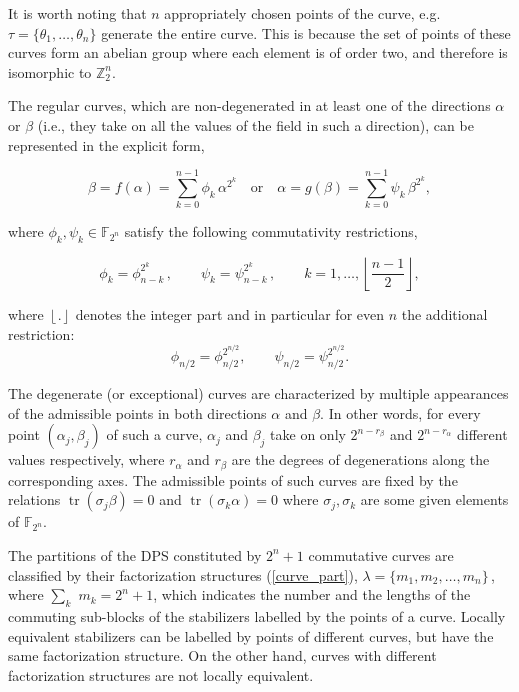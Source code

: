 \documentclass{article}
\DeclareMathOperator{\tr}{tr}
\begin{document}
It is worth noting that $n$ appropriately chosen points of the curve, e.g. $\tau
= \{\theta _{1},\ldots,\theta_{n}\}$ generate the entire curve. This is because
the set of points of these curves form an abelian group where each element is of
order two, and therefore is isomorphic to $\mathbb Z_{2}^n$.

The regular curves, which are non-degenerated in at least one of the directions
$\alpha$ or $\beta$ (i.e., they take on all the values of the field in such a
direction), can be represented in the explicit form,

\begin{equation}
  \beta = f(\alpha) = \sum_{k=0}^{n-1} \phi_{k} \, \alpha^{2^{k}}
  \quad \text{or}
  \quad \alpha = g(\beta) = \sum_{k=0}^{n-1} \psi_{k}\,\beta^{2^{k}},
  \label{RC}
\end{equation}

where $\phi_{k},\psi_{k} \in \mathbb{F}_{2^{n}}$ satisfy the following
commutativity restrictions,

\begin{equation}
  \phi_{k}
  = \phi _{n-k}^{2^{k}}\,, \qquad \psi_{k}
  = \psi_{n-k}^{2^{k}}\,, \qquad k=1,\ldots,
  \left\lfloor \frac{n-1}{2}\right\rfloor,
  \label{Acc}
\end{equation}

where $\left\lfloor . \right\rfloor$ denotes the integer part and in particular
for even $n$ the additional restriction:
\begin{equation}
  \phi_{n/2}
  = \phi_{n/2}^{2^{n/2}}, \qquad \psi_{n/2}
  = \psi_{n/2}^{2^{n/2}}.
\end{equation}

The degenerate (or exceptional) curves are characterized by multiple appearances
of the admissible points in both directions $\alpha $ and $\beta$. In other
words, for every point $(\alpha_{j},\beta_{j})$ of such a curve, $\alpha_{j}$ and
$\beta_{j}$ take on only $2^{n-r_{\beta }}$ and $2^{n-r_{\alpha}}$ different
values respectively, where $r_{\alpha }$ and $r_{\beta }$ are the degrees of
degenerations along the corresponding axes. The admissible points of such curves
are fixed by the relations $\tr(\sigma_{j}\beta)=0$ and
$\tr(\sigma_{k}\alpha)=0$ where $\sigma_{j}, \sigma_{k}$ are some given elements
of $\mathbb{F}_{2^{n}}$.

The partitions of the DPS constituted by $2^{n}+1$ commutative curves are
classified by their factorization structures (\ref{curve_part}), $\lambda
=\{m_{1},m_{2},\ldots ,m_{n}\}\,$, where $\sum_{k}$ $m_{k}=2^{n}+1$, which
indicates the number and the lengths of the commuting sub-blocks of the
stabilizers labelled by the points of a curve. Locally equivalent stabilizers
can be labelled by points of different curves, but  have the same factorization
structure. On the other hand, curves with different factorization structures are
not locally equivalent.
\end{document}
